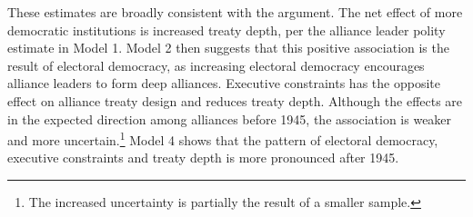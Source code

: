 \documentclass[12pt]{article}
\begin{document}
These estimates are broadly consistent with the argument. 
The net effect of more democratic institutions is increased treaty depth, per the alliance leader polity estimate in Model 1. 
Model 2 then suggests that this positive association is the result of electoral democracy, as increasing electoral democracy encourages alliance leaders to form deep alliances. 
Executive constraints has the opposite effect on alliance treaty design and reduces treaty depth. 
Although the effects are in the expected direction among alliances before 1945, the association is weaker and more uncertain.\footnote{The increased uncertainty is partially the result of a smaller sample.} 
Model 4 shows that the pattern of electoral democracy, executive constraints and treaty depth is more pronounced after 1945. 


\begin{table}[!htbp] \centering 
\end{table}
\end{document}

